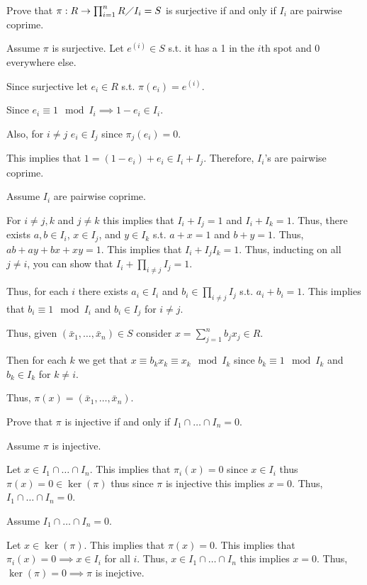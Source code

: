 \documentclass[12pt, letterpaper]{article}
\begin{document}
\begin{subproblem}{}
    Prove that $\pi : R \to \prod_{i=1}^n R \diagup I_i=S$ is surjective if and only if $I_i$ are pairwise coprime.
\end{subproblem}
\begin{problemproof}
    Assume $\pi$ is surjective. Let $e^{(i)} \in S$ s.t. it has a 1 in the $i$th spot and 0 everywhere else.
    
    Since surjective let $e_i \in R$ s.t. $\pi(e_i)=e^{(i)}$.

    Since $e_i \equiv 1 \mod I_i \implies 1-e_i \in I_i$.

    Also, for $i \neq j$ $e_i \in I_j$ since $\pi_j(e_i)=0$.

    This implies that $1=(1-e_i)+e_i \in I_i + I_j$. Therefore, $I_i$'s are pairwise coprime.

    Assume $I_i$ are pairwise coprime.

    For $i \neq j,k$ and $j \neq k$ this implies that $I_i+I_j=1$ and $I_i+I_k=1$. Thus, there exists $a,b \in I_i$, $x \in I_j$, and $y \in I_k$ s.t.
    $a+x=1$ and $b+y=1$. Thus, $ab+ay+bx+xy=1$. This implies that $I_i + I_j I_k = 1$. Thus, inducting on all $j \neq i$, you can show that
    $I_i + \prod_{i \neq j} I_j = 1$.

    Thus, for each $i$ there exists $a_i \in I_i$ and $b_i \in \prod_{i \neq j} I_j$ s.t. $a_i + b_i =1$. This implies that $b_i \equiv 1 \mod I_i$ and $b_i \in I_j$ for $i\neq j$.

    Thus, given $(\bar{x}_1,\dots,\bar{x}_n) \in S$ consider $x=\sum_{j=1}^n b_jx_j \in R$.

    Then for each $k$ we get that $x \equiv b_kx_k \equiv x_k \mod I_k$ since $b_k \equiv 1 \mod I_k$ and $b_k \in I_k$ for $k \neq i$.

    Thus, $\pi(x)=(\bar{x}_1,\dots,\bar{x}_n)$.
\end{problemproof}

\begin{subproblem}{}
    Prove that $\pi$ is injective if and only if $I_1 \cap \dots \cap I_n = 0$.
\end{subproblem}
\begin{problemproof}
    Assume $\pi$ is injective.

    Let $x \in I_1 \cap \dots \cap I_n$. This implies that $\pi_i(x)=0$ since $x \in I_i$ thus $\pi(x)=0 \in \ker(\pi)$ thus since $\pi$ is injective this implies $x=0$. Thus, $I_1 \cap \dots \cap I_n =0$.

    Assume $I_1 \cap \dots \cap I_n = 0$. 
    
    Let $x \in \ker(\pi)$. This implies that $\pi(x)=0$. This implies that
    $\pi_i(x)=0 \implies x \in I_i$ for all $i$. Thus, $x \in I_1 \cap \dots \cap I_n$ this implies $x = 0$. Thus, $\ker(\pi)=0 \implies \pi$ is inejctive.
\end{problemproof}
\end{document}
